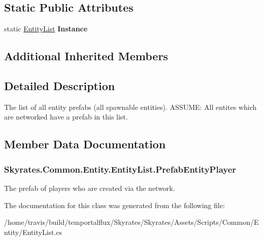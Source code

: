 \subsection*{Static Public Attributes}
\begin{DoxyCompactItemize}
\item 
\hypertarget{class_skyrates_1_1_common_1_1_entity_1_1_entity_list_a245112cf29f342bcb8fc4c44b560502c}{static \hyperlink{class_skyrates_1_1_common_1_1_entity_1_1_entity_list}{Entity\-List} {\bfseries Instance}}\label{class_skyrates_1_1_common_1_1_entity_1_1_entity_list_a245112cf29f342bcb8fc4c44b560502c}

\end{DoxyCompactItemize}
\subsection*{Additional Inherited Members}


\subsection{Detailed Description}
The list of all entity prefabs (all spawnable entities). A\-S\-S\-U\-M\-E\-: All entites which are networked have a prefab in this list. 



\subsection{Member Data Documentation}
\hypertarget{class_skyrates_1_1_common_1_1_entity_1_1_entity_list_ac000d4ac8899bd2b5cf36f22fd7e52ce}{
\subsubsection[{Prefab\-Entity\-Player}]{ Skyrates.\-Common.\-Entity.\-Entity\-List.\-Prefab\-Entity\-Player}}\label{class_skyrates_1_1_common_1_1_entity_1_1_entity_list_ac000d4ac8899bd2b5cf36f22fd7e52ce}


The prefab of players who are created via the network. 



The documentation for this class was generated from the following file\-:\begin{DoxyCompactItemize}
\item 
/home/travis/build/temportalflux/\-Skyrates/\-Skyrates/\-Assets/\-Scripts/\-Common/\-Entity/Entity\-List.\-cs\end{DoxyCompactItemize}
